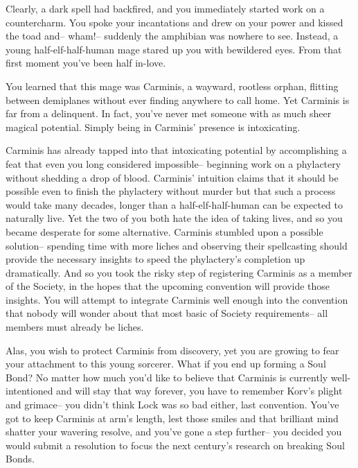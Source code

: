 \documentclass[char]{Sel}
\begin{document}
Clearly, a dark spell had backfired, and you immediately started work on a countercharm. You spoke your incantations and drew on your power and kissed the toad and-- wham!-- suddenly the amphibian was nowhere to see. Instead, a young half-elf-half-human mage stared up you with bewildered eyes. From that first moment you've been half in-love.

You learned that this mage was Carminis, a wayward, rootless orphan, flitting between demiplanes without ever finding anywhere to call home. Yet Carminis is far from a delinquent. In fact, you've never met someone with as much sheer magical potential. Simply being in Carminis' presence is intoxicating.

Carminis has already tapped into that intoxicating potential by accomplishing a feat that even you long considered impossible-- beginning work on a phylactery without shedding a drop of blood. Carminis' intuition claims that it should be possible even to finish the phylactery without murder but that such a process would take many decades, longer than a half-elf-half-human can be expected to naturally live. Yet the two of you both hate the idea of taking lives, and so you became desperate for some alternative.
Carminis stumbled upon a possible solution-- spending time with more liches and observing their spellcasting should provide the necessary insights to speed the phylactery's completion up dramatically. And so you took the risky step of registering Carminis as a member of the Society, in the hopes that the upcoming convention will provide those insights. You will attempt to integrate Carminis well enough into the convention that nobody will wonder about that most basic of Society requirements-- all members must already be liches.

Alas, you wish to protect Carminis from discovery, yet you are growing to fear your attachment to this young sorcerer. What if you end up forming a Soul Bond? No matter how much you’d like to believe that Carminis is currently well-intentioned and will stay that way forever, you have to remember Korv’s plight and grimace-- you didn’t think Lock was so bad either, last convention. You've got to keep Carminis at arm’s length, lest those smiles and that brilliant mind shatter your wavering resolve, and you’ve gone a step further-- you decided you would submit a resolution to focus the next century’s research on breaking Soul Bonds.
\end{document}
